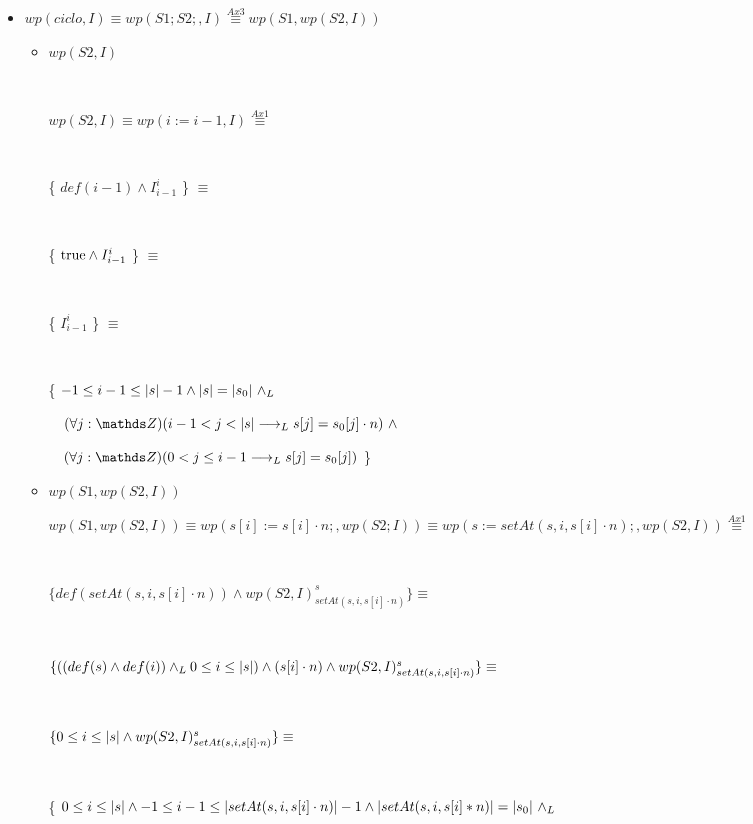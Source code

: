 \documentclass{article}
\begin{document}
\begin{itemize}

    \item $wp(ciclo, I) \equiv wp(S1;S2;, I) \stackrel{Ax3}{\equiv} wp(S1,wp(S2,I)) $

    \begin{itemize}
        \item $wp(S2, I)$

            $ $

            $wp(S2, I) \equiv wp(i:= i-1, I) \stackrel{Ax1}{\equiv}$

            $ $

            \{ $def(i-1) \wedge I_{i-1}^i $ \} $\equiv$

            $ $

            \{ $\mathrm{true} \wedge I_{i-1}^i $ \} $\equiv$

            $ $

            \{ $I_{i-1}^i $ \} $\equiv$

            $ $

            \{ $ -1 \leq i-1 \leq |s| - 1 \wedge |s| = |s_0|\ \land _L$
            
            $ \quad (\forall j: \ent)( i-1 < j < \longitud{s} \implicaLuego s[j] = s_0[j] \cdot n)\ \wedge $
            
            $ \quad (\forall j: \ent)( 0 < j \leq i-1 \implicaLuego s[j] = s_0[j]) $ \}


        \item $wp(S1,wp(S2,I))$

            $ wp(S1,wp(S2,I)) \equiv wp(s[i]:= s[i] \cdot n;, wp(S2; I)) \equiv wp(s:= setAt(s, i, s[i] \cdot n);, wp(S2,I)) \stackrel{Ax1}{\equiv} $

            $ $

            $ \{ def(setAt(s, i, s[i] \cdot n)) \wedge wp(S2,I)_{setAt(s, i, s[i] \cdot n)}^s \} \equiv $

            $ $

            $ \{ ((def(s) \wedge def(i)) \land _L 0 \leq i \leq |s|) \wedge (s[i] \cdot n) \wedge wp(S2,I)_{setAt(s, i, s[i] \cdot n)}^s \} \equiv $

            $ $

            $ \{ 0 \leq i \leq |s| \wedge wp(S2,I)_{setAt(s, i, s[i] \cdot n)}^s \} \equiv $

            $ $

            \{ $ 0 \leq i \leq \longitud{s} \wedge -1 \leq i-1 \leq \longitud{setAt(s, i, s[i] \cdot n)} - 1 \wedge \longitud{setAt(s, i, s[i]*n)} = \longitud{s_0}\ \yLuego$
            

\end{itemize}
\end{itemize}
\end{document}
